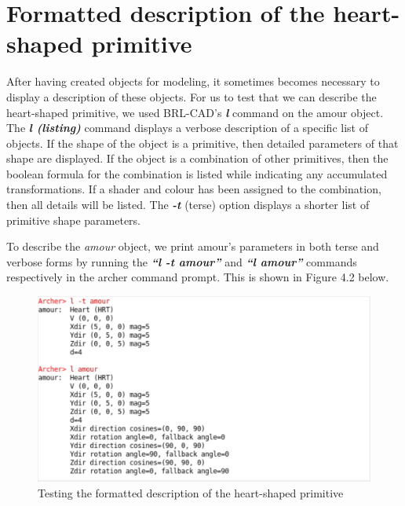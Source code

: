 \section{Formatted description of the heart­-shaped primitive}

After   having   created   objects   for   modeling,   it   sometimes   becomes  
necessary   to   display   a   description   of   these   objects.   For   us   to   test   that   we   can  
describe   the   heart-­shaped   primitive,   we   used   BRL-­CAD's   \textit{\textbf{l}} \cite{38}   command   on  
the   amour   object.   The   \textit{\textbf{l (listing)}}   command   displays   a   verbose   description   of   a
 specific   list   of   objects.   If   the   shape   of   the   object   is   a   primitive,   then   detailed  
parameters   of   that   shape   are   displayed.   If   the   object   is   a   combination   of   other  
primitives,   then   the   boolean   formula   for   the   combination   is   listed   while   indicating  
any   accumulated   transformations.   If   a   shader   and   colour   has   been   assigned   to  
the   combination,   then   all   details   will   be   listed.   The   \textit{\textbf{-­t}}   (terse)   option   displays   a  
shorter list of primitive shape parameters.

\hspace{30} To   describe   the   \textit{amour}   object,   we   print   amour's   parameters   in   both   terse  
and   verbose   forms   by   running   the   \textit{\textbf{“l -t amour”}}   and   \textit{\textbf{“l amour”}}   commands  
respectively in the archer command prompt. This is shown in Figure 4.2 below.

\begin{figure}[htbp]
\centering
\includegraphics[trim=0.0cm 0.5cm 0.1cm 0.1cm, clip=true, totalheight=0.4\textheight]{Pictures/Describe.png}
\caption[Testing the formatted description of the heart­-shaped primitive]{Testing the formatted description of the heart­-shaped primitive}
\label{Describe}
\end{figure}

